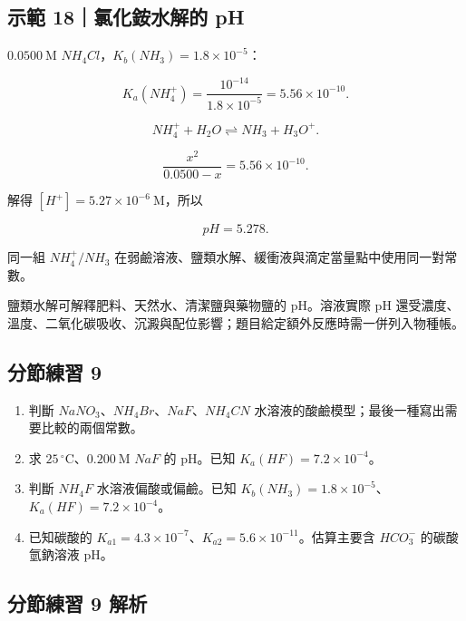 \documentclass[11pt,a4paper]{article}
\providecommand{\tightlist}{%
  \setlength{\itemsep}{0pt}\setlength{\parskip}{0pt}}
\begin{document}
\begin{HandoutWorkedExample}

\subsection{示範 18｜氯化銨水解的 pH}\label{ux793aux7bc4-18ux6c2fux5316ux92a8ux6c34ux89e3ux7684-ph}

\(0.0500\ \mathrm M\) \(NH_4Cl\)，\(K_b(NH_3)=1.8\times10^{-5}\)：

\[
K_a(NH_4^+)=\frac{10^{-14}}{1.8\times10^{-5}}
=5.56\times10^{-10}.
\]

\[
NH_4^++H_2O\rightleftharpoons NH_3+H_3O^+.
\]

\[
\frac{x^2}{0.0500-x}=5.56\times10^{-10}.
\]

解得 \([H^+]=5.27\times10^{-6}\ \mathrm M\)，所以

\[
pH=5.278.
\]

同一組 \(NH_4^+/NH_3\) 在弱鹼溶液、鹽類水解、緩衝液與滴定當量點中使用同一對常數。

\end{HandoutWorkedExample}

鹽類水解可解釋肥料、天然水、清潔鹽與藥物鹽的 pH。溶液實際 pH 還受濃度、溫度、二氧化碳吸收、沉澱與配位影響；題目給定額外反應時需一併列入物種帳。

\subsection{分節練習 9}\label{ux5206ux7bc0ux7df4ux7fd2-9}

\begin{enumerate}
\def\labelenumi{\arabic{enumi}.}
\tightlist
\item
  判斷 \(NaNO_3\)、\(NH_4Br\)、\(NaF\)、\(NH_4CN\) 水溶液的酸鹼模型；最後一種寫出需要比較的兩個常數。
\item
  求 \(25\,^\circ\mathrm C\)、\(0.200\ \mathrm M\) \(NaF\) 的 pH。已知 \(K_a(HF)=7.2\times10^{-4}\)。
\item
  判斷 \(NH_4F\) 水溶液偏酸或偏鹼。已知 \(K_b(NH_3)=1.8\times10^{-5}\)、\(K_a(HF)=7.2\times10^{-4}\)。
\item
  已知碳酸的 \(K_{a1}=4.3\times10^{-7}\)、\(K_{a2}=5.6\times10^{-11}\)。估算主要含 \(HCO_3^-\) 的碳酸氫鈉溶液 pH。
\end{enumerate}

\subsection{分節練習 9 解析}\label{ux5206ux7bc0ux7df4ux7fd2-9-ux89e3ux6790}
\end{document}
